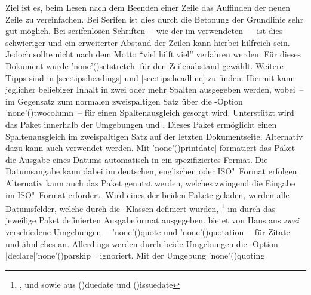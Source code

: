 \begin{DeclarePackages}[Typografie]
  Ziel ist es, beim Lesen nach dem Beenden einer Zeile das Auffinden der neuen 
  Zeile zu vereinfachen. Bei Serifen ist dies durch die Betonung der Grundlinie 
  sehr gut möglich. Bei serifenlosen Schriften~-- wie der im \TUDCD verwendeten 
  \OpenSans~-- ist dies schwieriger und ein erweiterter Abstand der Zeilen kann 
  hierbei hilfreich sein. Jedoch sollte nicht nach dem Motto 
  \enquote{viel hilft viel} verfahren werden. Für dieses Dokument wurde 
  \Macro'none'(){setstretch|} für den 
  Zeilenabstand gewählt. Weitere Tipps sind in \autoref{sec:tips:headings} und 
  \autoref{sec:tips:headline} zu finden.
  Hiermit kann jeglicher beliebiger Inhalt in zwei oder mehr Spalten ausgegeben 
  werden, wobei~-- im Gegensatz zum normalen zweispaltigen Satz über die
  \KOMAScript-Option \Option'none'(){twocolumn}~-- für einen 
  Spaltenausgleich gesorgt wird. Unterstützt wird das Paket innerhalb der 
  Umgebungen  und .
  Dieses Paket ermöglicht einen Spaltenausgleich im zweispaltigen Satz auf der 
  letzten Dokumentseite. Alternativ dazu kann auch  verwendet 
  werden.
  Mit \Macro'none'(){printdate|} formatiert 
  das Paket  die Ausgabe eines Datums automatisch in ein
  spezifiziertes Format. Die Datumsangabe kann dabei im deutschen, englischen 
  oder ISO"~Format erfolgen. Alternativ kann auch das Paket 
  genutzt werden, welches zwingend die Eingabe im ISO"~Format erfordert. Wird
  eines der beiden Pakete geladen, werden alle Datumsfelder, welche durch die 
  \TUDScript-Klassen definiert wurden,%
  \footnote{%
    ,  und  sowie aus 
     \Macro(){duedate} und 
    \Macro(){issuedate}%
  }
  im durch das jeweilige Paket definierten Ausgabeformat ausgegeben.
   bietet von Haus aus \emph{zwei} verschiedene Umgebungen~-- 
  \Environment'none'(){quote} und 
  \Environment'none'(){quotation}~-- für Zitate und 
  ähnliches an. Allerdings werden durch beide Umgebungen die \KOMAScript-Option 
  \Option|declare|'none'(){parskip=}
  ignoriert. Mit der Umgebung \Environment'none'(){quoting}

\end{DeclarePackages}
